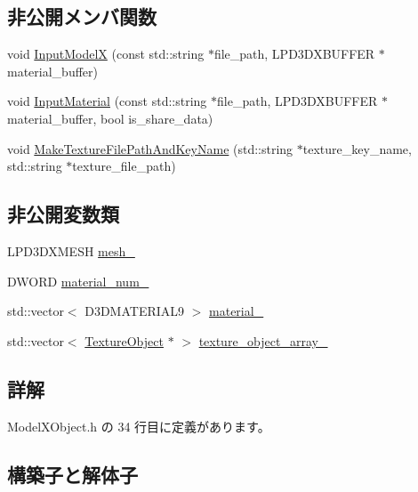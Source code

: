 \subsection*{非公開メンバ関数}
\begin{DoxyCompactItemize}
\item 
void \mbox{\hyperlink{class_model_x_object_ac7a86f4d034600ae5d8f8fd3610f4628}{Input\+ModelX}} (const std\+::string $\ast$file\+\_\+path, L\+P\+D3\+D\+X\+B\+U\+F\+F\+ER $\ast$material\+\_\+buffer)
\item 
void \mbox{\hyperlink{class_model_x_object_a612ecc2cb9b19ae1674dcc5ee8aab710}{Input\+Material}} (const std\+::string $\ast$file\+\_\+path, L\+P\+D3\+D\+X\+B\+U\+F\+F\+ER $\ast$material\+\_\+buffer, bool is\+\_\+share\+\_\+data)
\item 
void \mbox{\hyperlink{class_model_x_object_a83995ec817bccb4584d635b2005578a8}{Make\+Texture\+File\+Path\+And\+Key\+Name}} (std\+::string $\ast$texture\+\_\+key\+\_\+name, std\+::string $\ast$texture\+\_\+file\+\_\+path)
\end{DoxyCompactItemize}
\subsection*{非公開変数類}
\begin{DoxyCompactItemize}
\item 
L\+P\+D3\+D\+X\+M\+E\+SH \mbox{\hyperlink{class_model_x_object_a5ef4e892e06649ab32ba40e29d8acb8a}{mesh\+\_\+}}
\item 
D\+W\+O\+RD \mbox{\hyperlink{class_model_x_object_a8f421c1047c72f9b5e01942b8167a379}{material\+\_\+num\+\_\+}}
\item 
std\+::vector$<$ D3\+D\+M\+A\+T\+E\+R\+I\+A\+L9 $>$ \mbox{\hyperlink{class_model_x_object_a6b59d177c6056be64211b34b054e88a6}{material\+\_\+}}
\item 
std\+::vector$<$ \mbox{\hyperlink{class_texture_object}{Texture\+Object}} $\ast$ $>$ \mbox{\hyperlink{class_model_x_object_ab0af78894e6aa05a0aecb3174eafe26b}{texture\+\_\+object\+\_\+array\+\_\+}}
\end{DoxyCompactItemize}


\subsection{詳解}


 Model\+X\+Object.\+h の 34 行目に定義があります。



\subsection{構築子と解体子}
\mbox{\label{class_model_x_object_a83bd334b1f24a69c4cbdcaa62464ff31}} 
